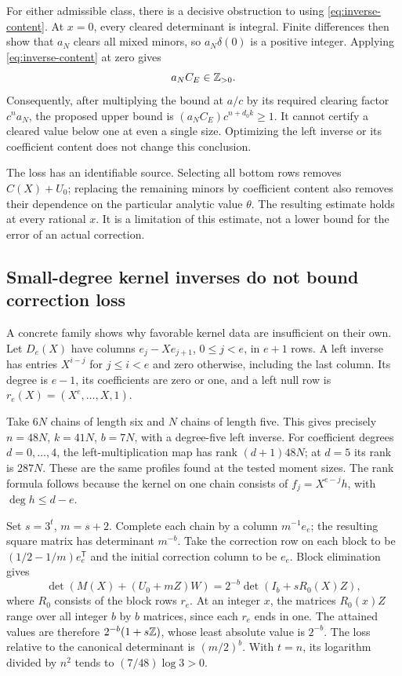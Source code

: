 For either admissible class, there is a decisive obstruction to using
\eqref{eq:inverse-content}. At $x=0$, every cleared determinant is
integral. Finite differences then show that $a_N$ clears all mixed
minors, so $a_N\delta(0)$ is a positive integer. Applying
\eqref{eq:inverse-content} at zero gives
\begin{equation}\label{eq:bridge-obstruction}
 a_N C_E\in\mathbb Z_{>0}.
\end{equation}
Consequently, after multiplying the bound at $a/c$ by its required
clearing factor $c^na_N$, the proposed upper bound is
$(a_NC_E)c^{n+d_0k}\ge1$. It cannot certify a cleared value below one
at even a single size. Optimizing the left inverse or its coefficient
content does not change this conclusion.

The loss has an identifiable source. Selecting all bottom rows removes
$C(X)+U_0$; replacing the remaining minors by coefficient content also
removes their dependence on the particular analytic value $\theta$.
The resulting estimate holds at every rational $x$. It is a limitation
of this estimate, not a lower bound for the error of an actual correction.

\subsection{Small-degree kernel inverses do not bound correction loss}

A concrete family shows why favorable kernel data are insufficient on
their own. Let $D_e(X)$ have columns $e_j-Xe_{j+1}$, $0\le j<e$,
in $e+1$ rows. A left inverse has entries $X^{i-j}$ for $j\le i<e$
and zero otherwise, including the last column. Its degree is $e-1$,
its coefficients are zero or one, and a left null row is
$r_e(X)=(X^e,\ldots,X,1)$.

Take $6N$ chains of length six and $N$ chains of length five. This
gives precisely $n=48N$, $k=41N$, $b=7N$, with a degree-five left
inverse. For coefficient degrees $d=0,\ldots,4$, the left-multiplication
map has rank $(d+1)48N$; at $d=5$ its rank is $287N$. These are the
same profiles found at the tested moment sizes. The rank formula follows
because the kernel on one chain consists of
$f_j=X^{e-j}h$, with $\deg h\le d-e$.

Set $s=3^t$, $m=s+2$. Complete each chain by a column $m^{-1}e_e$;
the resulting square matrix has determinant $m^{-b}$. Take the
correction row on each block to be $(1/2-1/m)e_e^{\mathsf T}$ and
the initial correction column to be $e_e$. Block elimination gives
\[
 \det(M(X)+(U_0+mZ)W)=2^{-b}\det(I_b+sR_0(X)Z),
\]
where $R_0$ consists of the block rows $r_e$. At an integer $x$, the
matrices $R_0(x)Z$ range over all integer $b$ by $b$ matrices, since
each $r_e$ ends in one. The attained values are therefore
$2^{-b}(1+s\mathbb Z)$, whose least absolute value is $2^{-b}$.
The loss relative to the canonical determinant is $(m/2)^b$.
With $t=n$, its logarithm divided by $n^2$ tends to
$(7/48)\log3>0$.

